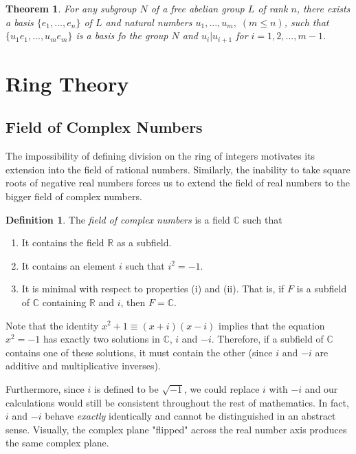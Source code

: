 \documentclass{article}
\newtheorem{theorem}{Theorem}[section]
\theoremstyle{remark}
\theoremstyle{definition}
\newtheorem{definition}{Definition}[section]
\begin{document}
\begin{theorem}
For any subgroup $N$ of a free abelian group $L$ of rank $n$, there exists a basis $\{e_1, ..., e_n\}$ of $L$ and natural numbers $u_1, ..., u_m, \; (m \leq n)$, such that $\{u_1 e_1, ..., u_m e_m\}$ is a basis fo the group $N$ and $u_i | u_{i+1}$ for $i = 1, 2, ..., m-1$. 
\end{theorem}

\section{Ring Theory}
\subsection{Field of Complex Numbers}
The impossibility of defining division on the ring of integers motivates its extension into the field of rational numbers. Similarly, the inability to take square roots of negative real numbers forces us to extend the field of real numbers to the bigger field of complex numbers. 

\begin{definition}
The \textit{field of complex numbers} is a field $\mathbb{C}$ such that 
\begin{enumerate}
    \item It contains the field $\mathbb{R}$ as a subfield. 
    \item It contains an element $i$ such that $i^2 = -1$.
    \item It is minimal with respect to properties (i) and (ii). That is, if $F$ is a subfield of $\mathbb{C}$ containing $\mathbb{R}$ and $i$, then $F = \mathbb{C}$. 
\end{enumerate}
\end{definition}

Note that the identity $x^2 + 1 \equiv (x + i) (x - i)$ implies that the equation $x^2 = -1$ has exactly two solutions in $\mathbb{C}$, $i$ and $-i$. Therefore, if a subfield of $\mathbb{C}$ contains one of these solutions, it must contain the other (since $i$ and $-i$ are additive and multiplicative inverses). 

Furthermore, since $i$ is defined to be $\sqrt{-1}$, we could replace $i$ with $-i$ and our calculations would still be consistent throughout the rest of mathematics. In fact, $i$ and $-i$ behave \textit{exactly} identically and cannot be distinguished in an abstract sense. Visually, the complex plane "flipped" across the real number axis produces the same complex plane. 
\end{document}
